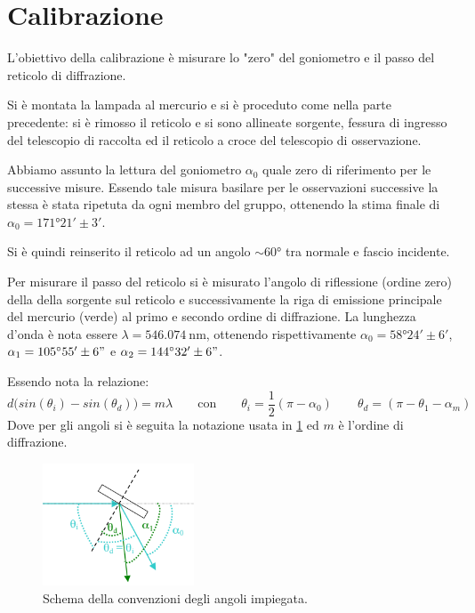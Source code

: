 \section{Calibrazione}
	L'obiettivo della calibrazione è misurare lo "zero" del goniometro e il passo del reticolo di diffrazione.
	
	Si è montata la lampada al mercurio e si è proceduto come nella parte precedente:
	si è rimosso il reticolo e si sono allineate sorgente, fessura di ingresso del telescopio di raccolta
	ed il reticolo a croce del telescopio di osservazione.
	
	Abbiamo assunto la lettura del goniometro
	$\alpha_0$ quale zero di riferimento per le successive misure.
	Essendo tale misura basilare per le osservazioni successive la stessa è stata ripetuta da ogni membro del gruppo,
	ottenendo la stima finale di $\alpha_0 = \ang{171;21; } \pm 3' $.
	
	Si è quindi reinserito il reticolo ad un angolo $\sim \ang{60}$
	tra normale e fascio incidente.

	Per misurare il passo del reticolo si è misurato l'angolo di riflessione (ordine zero) della della sorgente sul reticolo e successivamente la riga di emissione principale del mercurio (verde) al 
	primo e secondo ordine di diffrazione. La lunghezza d'onda è nota essere $\lambda = \SI{546.074}{\nano\meter}$,
	ottenendo rispettivamente $\alpha_0=\ang{58;24;} \pm 6'$, $\alpha_1=\ang{105;55;}\pm 6"$ e $\alpha_2=\ang{144;32;}\pm 6"$.
	
	Essendo nota la relazione:
	\smallskip
	\begin{equation*}
	d\bigl(sin (\theta_i) - sin (\theta_d)\bigr) = m \lambda\qquad \text{con}\qquad \theta_i=\frac{1}{2}(\pi- \alpha_0)\qquad \theta_d=(\pi- \theta_1-\alpha_m)
	\end{equation*}
	Dove per gli angoli si è seguita la notazione usata in \figurename{ \ref{fig:angoli}} ed $m$ è l'ordine di diffrazione.
	\bigskip
	\begin{figure} [H]
		\centering
		\includegraphics[width=0.4\textwidth]{../FIgs-tabs/angoli.png}
		\caption{Schema della convenzioni degli angoli impiegata.}
		\label{fig:angoli}
	\end{figure}
	\smallskip

